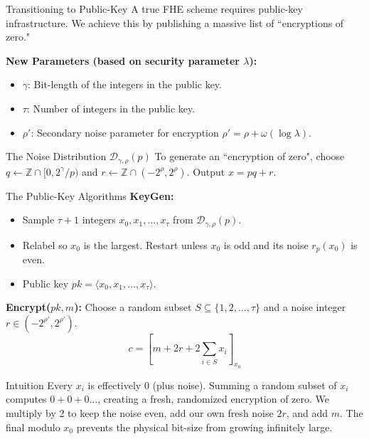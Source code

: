 \documentclass[10pt,handout]{beamer}
\begin{document}
\begin{frame}{Transitioning to Public-Key}
    A true FHE scheme requires public-key infrastructure. We achieve this by publishing a massive list of ``encryptions of zero."
    \pause

    \vspace{0.2cm}
    \textbf{New Parameters (based on security parameter $\lambda$):}
    \begin{itemize}
        \item $\gamma$: Bit-length of the integers in the public key.
        \item $\tau$: Number of integers in the public key.
        \item $\rho'$: Secondary noise parameter for encryption $\rho' = \rho + \omega(\log \lambda)$.
    \end{itemize}
    \pause

    \vspace{0.2cm}
    \begin{block}{The Noise Distribution $\mathcal{D}_{\gamma,\rho}(p)$}
    To generate an ``encryption of zero", choose $q \leftarrow \mathbb{Z} \cap [0, 2^\gamma/p)$ and $r \leftarrow \mathbb{Z} \cap (-2^\rho, 2^\rho)$. 
    Output $x = pq + r$.
    \end{block}
\end{frame}

\begin{frame}{The Public-Key Algorithms}
    \textbf{KeyGen:}
    \begin{itemize}
        \item Sample $\tau + 1$ integers $x_0, x_1, \dots, x_\tau$ from $\mathcal{D}_{\gamma,\rho}(p)$. 
        \item Relabel so $x_0$ is the largest. Restart unless $x_0$ is odd and its noise $r_p(x_0)$ is even.
        \item Public key $pk = \langle x_0, x_1, \dots, x_\tau \rangle$.
    \end{itemize}
    \pause
    
    \vspace{0.3cm}
    \textbf{Encrypt($pk, m$):}
    Choose a random subset $S \subseteq \{1, 2, \dots, \tau\}$ and a noise integer $r \in (-2^{\rho'}, 2^{\rho'})$.
    $$c = \left[ m + 2r + 2\sum_{i \in S} x_i \right]_{x_0}$$
    \pause
    
    \begin{block}{Intuition}
    Every $x_i$ is effectively $0$ (plus noise). Summing a random subset of $x_i$ computes $0+0+0\dots$, creating a fresh, randomized encryption of zero. We multiply by 2 to keep the noise even, add our own fresh noise $2r$, and add $m$. The final modulo $x_0$ prevents the physical bit-size from growing infinitely large.
    \end{block}
\end{frame}
\end{document}
